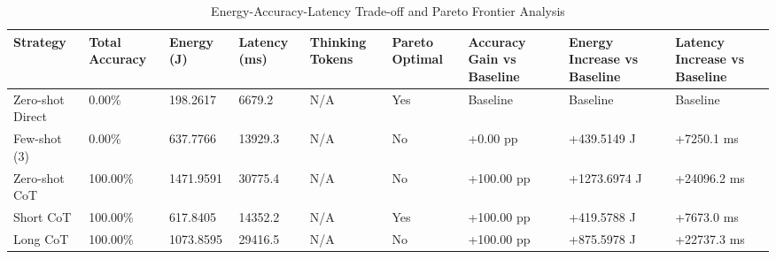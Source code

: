 \begin{table}
\caption{Energy-Accuracy-Latency Trade-off and Pareto Frontier Analysis}
\label{tab:tradeoff_comparison}
\begin{tabular}{lllllllll}
\toprule
Strategy & Total Accuracy & Energy (J) & Latency (ms) & Thinking Tokens & Pareto Optimal & Accuracy Gain vs Baseline & Energy Increase vs Baseline & Latency Increase vs Baseline \\
\midrule
Zero-shot Direct & 0.00\% & 198.2617 & 6679.2 & N/A & Yes & Baseline & Baseline & Baseline \\
Few-shot (3) & 0.00\% & 637.7766 & 13929.3 & N/A & No & +0.00 pp & +439.5149 J & +7250.1 ms \\
Zero-shot CoT & 100.00\% & 1471.9591 & 30775.4 & N/A & No & +100.00 pp & +1273.6974 J & +24096.2 ms \\
Short CoT & 100.00\% & 617.8405 & 14352.2 & N/A & Yes & +100.00 pp & +419.5788 J & +7673.0 ms \\
Long CoT & 100.00\% & 1073.8595 & 29416.5 & N/A & No & +100.00 pp & +875.5978 J & +22737.3 ms \\
\bottomrule
\end{tabular}
\end{table}
